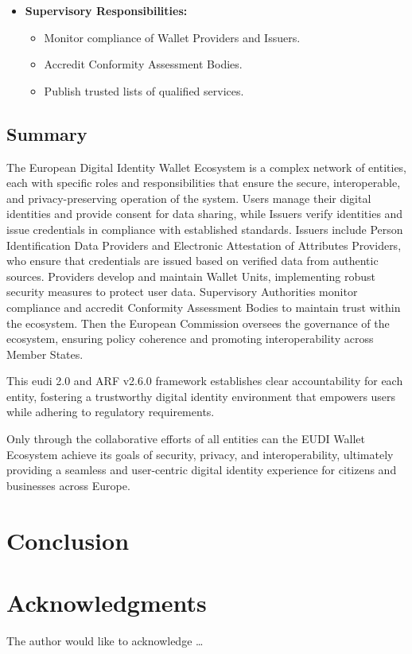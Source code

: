\documentclass[sigconf,balance,nonacm,authordraft]{acmart}
\begin{document}
\begin{itemize}
  \item \textbf{Supervisory Responsibilities:}
    \begin{itemize}
      \item Monitor compliance of Wallet Providers and Issuers.
      \item Accredit Conformity Assessment Bodies.
      \item Publish trusted lists of qualified services.
    \end{itemize}



\end{itemize}

\subsection{Summary}

The European Digital Identity Wallet Ecosystem is a complex network of entities, each with specific roles and responsibilities that ensure the secure, interoperable, and privacy-preserving operation of the system. 
Users manage their digital identities and provide consent for data sharing, while Issuers verify identities and issue credentials in compliance with established standards. 
Issuers include Person Identification Data Providers and Electronic Attestation of Attributes Providers, who ensure that credentials are issued based on verified data from authentic sources. 
Providers develop and maintain Wallet Units, implementing robust security measures to protect user data.
Supervisory Authorities monitor compliance and accredit Conformity Assessment Bodies to maintain trust within the ecosystem.
Then the European Commission oversees the governance of the ecosystem, ensuring policy coherence and promoting interoperability across Member States.

This eudi 2.0 and ARF v2.6.0 framework establishes clear accountability for each entity, fostering a trustworthy digital identity environment that empowers users while adhering to regulatory requirements.

Only through the collaborative efforts of all entities can the EUDI Wallet Ecosystem achieve its goals of security, privacy, and interoperability, ultimately providing a seamless and user-centric digital identity experience for citizens and businesses across Europe.
\section{Conclusion}
\label{sec:conclusion}




\section*{Acknowledgments}
The author would like to acknowledge \ldots



\end{document}
